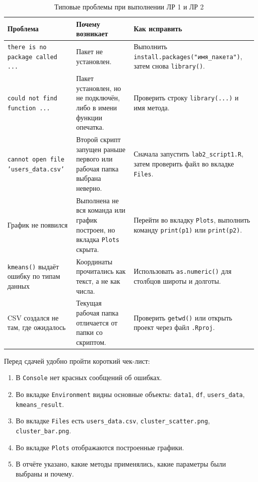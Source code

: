 \documentclass[14pt,a4paper]{extarticle}
\begin{document}
\begin{table}[H]
\caption{Типовые проблемы при выполнении ЛР 1 и ЛР 2}
\begin{tabularx}{\textwidth}{|Y|Y|Y|}
\hline
\textbf{Проблема} & \textbf{Почему возникает} & \textbf{Как исправить} \\
\hline
\texttt{there is no package called ...} & Пакет не установлен. & Выполнить \texttt{install.packages("имя\_пакета")}, затем снова \texttt{library()}. \\
\hline
\texttt{could not find function ...} & Пакет установлен, но не подключён, либо в имени функции опечатка. & Проверить строку \texttt{library(...)} и имя метода. \\
\hline
\texttt{cannot open file 'users\_data.csv'} & Второй скрипт запущен раньше первого или рабочая папка выбрана неверно. & Сначала запустить \texttt{lab2\_script1.R}, затем проверить файл во вкладке \texttt{Files}. \\
\hline
График не появился & Выполнена не вся команда или график построен, но вкладка \texttt{Plots} скрыта. & Перейти во вкладку \texttt{Plots}, выполнить команду \texttt{print(p1)} или \texttt{print(p2)}. \\
\hline
\texttt{kmeans()} выдаёт ошибку по типам данных & Координаты прочитались как текст, а не как числа. & Использовать \texttt{as.numeric()} для столбцов широты и долготы. \\
\hline
CSV создался не там, где ожидалось & Текущая рабочая папка отличается от папки со скриптом. & Проверить \texttt{getwd()} или открыть проект через файл \texttt{.Rproj}. \\
\hline
\end{tabularx}
\end{table}

Перед сдачей удобно пройти короткий чек-лист:

\begin{enumerate}[nosep]
  \item В \texttt{Console} нет красных сообщений об ошибках.
  \item Во вкладке \texttt{Environment} видны основные объекты: \texttt{data1}, \texttt{df}, \texttt{users\_data}, \texttt{kmeans\_result}.
  \item Во вкладке \texttt{Files} есть \texttt{users\_data.csv}, \texttt{cluster\_scatter.png}, \texttt{cluster\_bar.png}.
  \item Во вкладке \texttt{Plots} отображаются построенные графики.
  \item В отчёте указано, какие методы применялись, какие параметры были выбраны и почему.
\end{enumerate}
\end{document}
